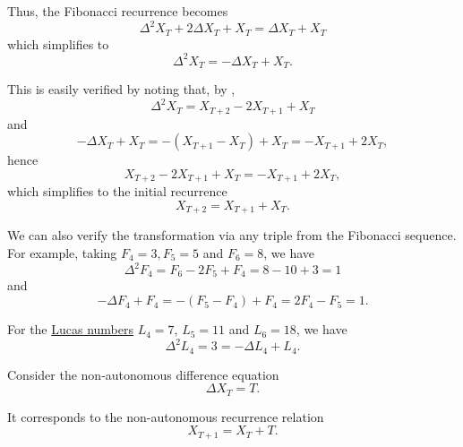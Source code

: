 \begin{example}
\begin{thmenum}
    Thus, the Fibonacci recurrence becomes
    \begin{equation*}
      \Delta^2 X_T + 2 \Delta X_T + X_T = \Delta X_T + X_T
    \end{equation*}
    which simplifies to
    \begin{equation}\label{eq:ex:def:difference_equation/fibonacci}
      \Delta^2 X_T = -\Delta X_T + X_T.
    \end{equation}

    This is easily verified by noting that, by ,
    \begin{equation*}
      \Delta^2 X_T = X_{T+2} - 2X_{T+1} + X_T
    \end{equation*}
    and
    \begin{equation*}
      -\Delta X_T + X_T = -(X_{T+1} - X_T) + X_T = -X_{T+1} + 2X_T,
    \end{equation*}
    hence
    \begin{equation*}
      X_{T+2} - 2X_{T+1} + X_T = -X_{T+1} + 2X_T,
    \end{equation*}
    which simplifies to the initial recurrence
    \begin{equation*}
      X_{T+2} = X_{T+1} + X_T.
    \end{equation*}

    We can also verify the transformation via any triple from the Fibonacci sequence. For example, taking \( F_4 = 3, F_5 = 5 \) and \( F_6 = 8 \), we have
    \begin{equation*}
      \Delta^2 F_4 = F_6 - 2F_5 + F_4 = 8 - 10 + 3 = 1
    \end{equation*}
    and
    \begin{equation*}
      -\Delta F_4 + F_4 = -(F_5 - F_4) + F_4 = 2F_4 - F_5 = 1.
    \end{equation*}

    For the \hyperref[def:lucas_numbers]{Lucas numbers} \( L_4 = 7 \), \( L_5 = 11 \) and \( L_6 = 18 \), we have
    \begin{equation*}
      \Delta^2 L_4 = 3 = -\Delta L_4 + L_4.
    \end{equation*}

     Consider the non-autonomous difference equation
    \begin{equation*}
      \Delta X_T = T.
    \end{equation*}

    It corresponds to the non-autonomous recurrence relation
    \begin{equation*}
      X_{T+1} = X_T + T.
    \end{equation*}


\end{thmenum}
\end{example}
